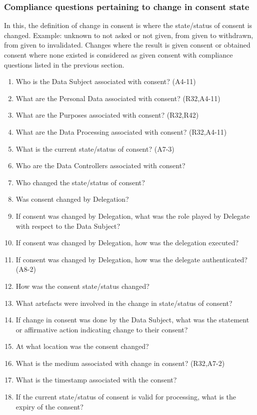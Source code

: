 \subsubsection{Compliance questions pertaining to change in consent state}\label{sec:info:CQ:6}
In this, the definition of change in consent is where the state/status of consent is changed. Example: unknown to not asked or not given, from given to withdrawn, from given to invalidated. Changes where the result is given consent or obtained consent where none existed is considered as given consent with compliance questions listed in the previous section.
\begin{enumerate}[label={\textit{CMQ.\theenumi}},resume]
    \item Who is the Data Subject associated with consent? (A4-11)
    \item What are the Personal Data associated with consent? (R32,A4-11)
    \item What are the Purposes associated with consent? (R32,R42)
    \item What are the Data Processing associated with consent? (R32,A4-11)
    \item What is the current state/status of consent? (A7-3)
    \item Who are the Data Controllers associated with consent?
    \item Who changed the state/status of consent?
    \item Was consent changed by Delegation?
    \item If consent was changed by Delegation, what was the role played by Delegate with respect to the Data Subject?
    \item If consent was changed by Delegation, how was the delegation executed?
    \item If consent was changed by Delegation, how was the delegate authenticated? (A8-2)
    \item How was the consent state/status changed?
    \item What artefacts were involved in the change in state/status of consent?
    \item If change in consent was done by the Data Subject, what was the statement or affirmative action indicating change to their consent?
    \item At what location was the consent changed?
    \item What is the medium associated with change in consent? (R32,A7-2)
    \item What is the timestamp associated with the consent?
    \item If the current state/status of consent is valid for processing, what is the expiry of the consent?
\end{enumerate}

